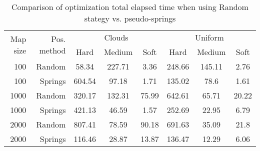 \begin{table}[htb]
	\centering
	\footnotesize
	\begin{tabular}{|r|r|c|c|c|c|c|c|} 
		\hline
		\multirow{2}{*}{Map size} & \multirow{2}{*}{Pos. method} & \multicolumn{3}{c|}{Clouds} & \multicolumn{3}{c|}{Uniform} \\ 
		\cline{2-8} 
		 & & Hard & Medium & Soft & Hard & Medium & Soft\\ 
		\hline 
		100 & Random & 58.34 & 227.71 & 3.36 & 248.66 & 145.11 & 2.76 \\ 
		100 & Springs & 604.54 & 97.18 & 1.71 & 135.02 & 78.6 & 1.61 \\ 
		1000 & Random & 320.17 & 132.31 & 75.99 & 642.61 & 65.71 & 20.22 \\ 
		1000 & Springs & 421.13 & 46.59 & 1.57 & 252.69 & 22.95 & 6.79 \\ 
		2000 & Random & 807.41 & 78.59 & 90.18 & 691.63 & 35.09 & 21.8 \\ 
		2000 & Springs & 116.46 & 28.87 & 13.87 & 136.47 & 12.29 & 6.06 \\ 
		\hline 
	\end{tabular} 
	\caption{Comparison of optimization total elapsed time when using Random stategy vs. pseudo-springs} 
	\label{tab:timeper} 
\end{table} 
